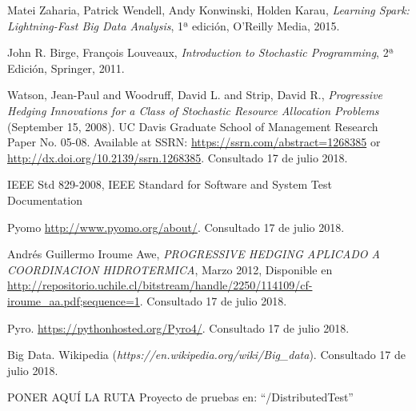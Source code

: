 

\begin{thebibliography}{99}
% 
% 
% 

 Matei Zaharia, Patrick Wendell, Andy Konwinski, Holden Karau, {\it Learning Spark: Lightning-Fast Big Data Analysis}, 1ª edición, O'Reilly Media, 2015.

 John R. Birge, François Louveaux, {\it Introduction to Stochastic Programming}, 2ª Edición, Springer, 2011.

  Watson, Jean-Paul and Woodruff, David L. and Strip, David R., {\it Progressive Hedging Innovations for a Class of Stochastic Resource Allocation Problems} (September 15, 2008). UC Davis Graduate School of Management Research Paper No. 05-08. Available at SSRN: \url{https://ssrn.com/abstract=1268385} or \url{http://dx.doi.org/10.2139/ssrn.1268385}. Consultado 17 de julio 2018.

 IEEE Std 829-2008, IEEE Standard for Software and System Test Documentation

 Pyomo \url{http://www.pyomo.org/about/}. Consultado 17 de julio 2018.

 Andrés Guillermo Iroume Awe, {\it PROGRESSIVE  HEDGING APLICADO A COORDINACION HIDROTERMICA}, Marzo 2012, Disponible en \url{http://repositorio.uchile.cl/bitstream/handle/2250/114109/cf-iroume_aa.pdf;sequence=1}. Consultado 17 de julio 2018.

 Pyro. \url{https://pythonhosted.org/Pyro4/}. Consultado 17 de julio 2018.

 Big Data. Wikipedia ({\it https://en.wikipedia.org/wiki/Big\_data}). Consultado 17 de julio 2018.


 PONER AQUÍ LA RUTA
 Proyecto de pruebas en: ``/DistributedTest''

\end{thebibliography}

